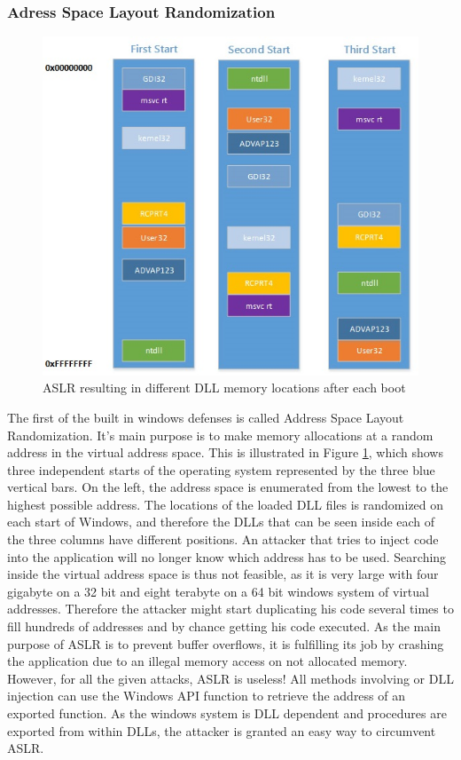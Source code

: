 \subsubsection{Adress Space Layout Randomization}
\begin{figure}[h]
\centering
\includegraphics[width=\textwidth,height=\textheight,keepaspectratio]{sections/background/defenses/aslr.jpg}
\caption{ASLR resulting in different DLL memory locations after each boot}
\label{fig:aslr}
\end{figure}
The first of the built in windows defenses is called Address Space Layout Randomization. It's main purpose is to make memory allocations at a random address in the virtual address space. This is illustrated in Figure \ref{fig:aslr}, which shows three independent starts of the operating system represented by the three blue vertical bars. On the left, the address space is enumerated from the lowest to the highest possible address. The locations of the loaded DLL files is randomized on each start of Windows, and therefore the DLLs that can be seen inside each of the three columns have different positions. An attacker that tries to inject code into the application will no longer know which address has to be used. Searching inside the virtual address space is thus not feasible, as it is very large with four gigabyte on a 32 bit and eight terabyte on a 64 bit windows system of virtual addresses. Therefore the attacker might start duplicating his code several times to fill hundreds of addresses and by chance getting his code executed. As the main purpose of ASLR is to prevent buffer overflows, it is fulfilling its job by crashing the application due to an illegal memory access on not allocated memory. However, for all the given attacks, ASLR is useless! All methods involving  or DLL injection can use the Windows API function  to retrieve the address of an exported function. As the windows system is DLL dependent and procedures are exported from within DLLs, the attacker is granted an easy way to circumvent ASLR.